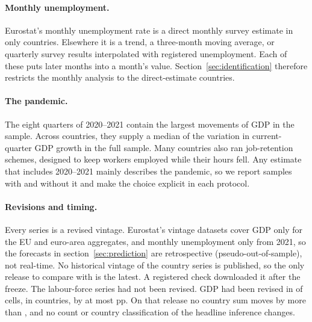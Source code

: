 \paragraph{Monthly unemployment.} Eurostat's monthly unemployment rate is a direct
monthly survey estimate in only  countries. Elsewhere it is a trend, a three-month
moving average, or quarterly survey results interpolated with registered unemployment.
Each of these puts later months into a month's value. Section~\ref{sec:identification}
therefore restricts the monthly analysis to the  direct-estimate countries.

\paragraph{The pandemic.} The eight quarters of 2020--2021 contain the largest movements
of GDP in the sample. Across countries, they supply a median
 of the variation in current-quarter GDP growth in the full
sample. Many countries also ran job-retention schemes, designed to keep workers employed
while their hours fell. Any estimate that includes 2020--2021 mainly describes the pandemic, so we
report samples with and without it and make the choice explicit in each protocol.

\paragraph{Revisions and timing.} Every series is a revised vintage. Eurostat's vintage
datasets cover GDP only for the EU and euro-area aggregates, and monthly unemployment only
from 2021, so the forecasts in section~\ref{sec:prediction} are retrospective
(pseudo-out-of-sample), not real-time. No historical vintage of the country series is
published, so the only release to compare with is the latest. A registered check
downloaded it after the freeze. The labour-force series had not been revised. GDP had
been revised in  of  cells, in
 countries, by at most  pp. On that release no
country sum moves by more than , and no count or country
classification of the headline inference changes.
